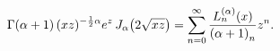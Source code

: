 \[\mathop{\Gamma\/}\nolimits\!\left(\alpha+1\right)(xz)^{-\frac{1}{2}\alpha}e^{z%
}\mathop{J_{\alpha}\/}\nolimits\!\left(2\sqrt{xz}\right)=\sum_{n=0}^{\infty}%
\frac{\mathop{L^{(\alpha)}_{n}\/}\nolimits\!\left(x\right)}{\left(\alpha+1%
\right)_{n}}z^{n}.\]